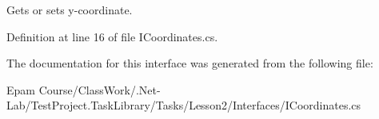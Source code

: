 Gets or sets y-\/coordinate. 



Definition at line 16 of file I\+Coordinates.\+cs.



The documentation for this interface was generated from the following file\+:\begin{DoxyCompactItemize}
\item 
Epam Course/\+Class\+Work/.\+Net-\/\+Lab/\+Test\+Project.\+Task\+Library/\+Tasks/\+Lesson2/\+Interfaces/I\+Coordinates.\+cs\end{DoxyCompactItemize}
